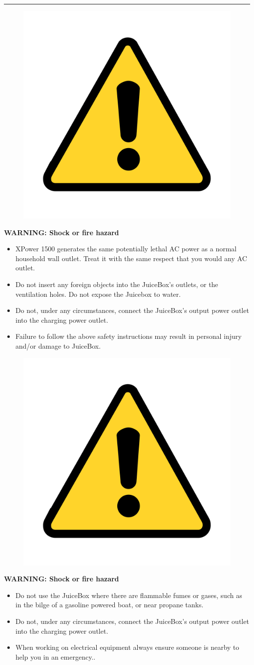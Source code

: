 \documentclass[10pt]{article}
\begin{document}
\hrule %
\begin{figure} %
    \centering
    \includegraphics[width=.75in]{warning_y} %
\end{figure}

\vspace{5mm}

\noindent   
\Large{\textbf{WARNING: Shock or fire hazard}} \\
\begin{large}                                        
	\begin{itemize}
		\item{ XPower 1500 generates the same potentially lethal AC power as a normal
			household wall outlet. Treat it with the same respect that you would any AC	
			outlet.}
		\item{Do not insert any foreign objects into the JuiceBox's outlets, or the ventilation holes. 
			Do not expose the Juicebox to water.}	
		\item{Do not, under any circumstances, connect the JuiceBox's output power outlet into the charging power outlet.}
		\item{Failure to follow the above safety instructions may result in personal injury
			and/or damage to JuiceBox.}
	\end{itemize}
\end{large}

\begin{figure}
    \centering
    \includegraphics[width=.75in]{warning_y}
\end{figure}

\vspace{5mm}

\noindent   
\Large{\textbf{WARNING: Shock or fire hazard}} \\
\begin{large}                                
	\begin{itemize}
		\item{ \leftskip=3cm Do not use the JuiceBox where there are flammable fumes or gases, such as
			in the bilge of a gasoline powered boat, or near propane tanks.}	
		\item{Do not, under any circumstances, connect the JuiceBox's output power outlet into the charging power outlet.}
		\item{When working on electrical equipment always ensure someone is nearby to
			help you in an emergency..}
	\end{itemize}
\end{large}
\end{document}
